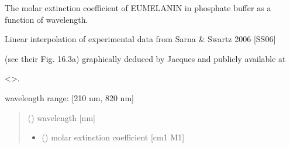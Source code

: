 \documentclass[letterpaper,10pt,english]{sphinxmanual}
\begin{document}
\begin{fulllineitems}
\label{\detokenize{03_absorption_coefficient:skinoptics.absorption_coefficient.molarext_eum_Sarna}}
\pysigstartsignatures
{}
\pysigstopsignatures
\begin{DUlineblock}{0em}
\item[] The molar extinction coefficient of EUMELANIN in phosphate buffer as a function of wavelength.
\item[] Linear interpolation of experimental data from Sarna \& Swartz 2006 {[}SS06{]}
\item[] (see their Fig. 16.3\sphinxhyphen{}a) graphically deduced by Jacques and publicly available at
\item[] \textless{}\textgreater{}.
\end{DUlineblock}

\begin{DUlineblock}{0em}
\item[] wavelength range: {[}210 nm, 820 nm{]}
\end{DUlineblock}
\begin{quote}\begin{description}
\sphinxAtStartPar
{} () \textendash{} wavelength {[}nm{]}

\sphinxAtStartPar
\begin{itemize}
\item {} 
\sphinxAtStartPar
{} () \textendash{} molar extinction coefficient {[}cm\sphinxhyphen{}1 M\sphinxhyphen{}1{]}

\end{itemize}


\end{description}\end{quote}

\end{fulllineitems}

\end{document}
